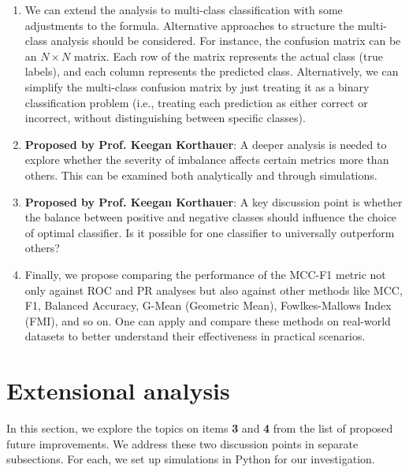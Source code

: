 \documentclass[12pt, oneside]{amsart}
\theoremstyle{definition}
\theoremstyle{remark}
\numberwithin{equation}{section}
\begin{document}
\begin{enumerate}
    \item We can extend the analysis to multi-class classification with some adjustments to the formula. Alternative approaches to structure the multi-class analysis should be considered. For instance, the confusion matrix can be an $N \times N$ matrix. Each row of the matrix represents the actual class (true labels), and each column represents the predicted class. Alternatively, we can simplify the multi-class confusion matrix by just treating it as a binary classification problem (i.e., treating each prediction as either correct or incorrect, without distinguishing between specific classes). 
    \item \textbf{Proposed by Prof. Keegan Korthauer}: A deeper analysis is needed to explore whether the severity of imbalance affects certain metrics more than others. This can be examined both analytically and through simulations.
    \item \textbf{Proposed by Prof. Keegan Korthauer}: A key discussion point is whether the balance between positive and negative classes should influence the choice of optimal classifier. Is it possible for one classifier to universally outperform others?
    \item Finally, we propose comparing the performance of the MCC-F1 metric not only against ROC and PR analyses but also against other methods like MCC, F1, Balanced Accuracy, G-Mean (Geometric Mean), Fowlkes-Mallows Index (FMI), and so on. One can apply and compare these methods on real-world datasets to better understand their effectiveness in practical scenarios.
\end{enumerate}
\section{Extensional analysis}
In this section, we explore the topics on items \textbf{3} and \textbf{4} from the list of proposed future improvements. We address these two discussion points in separate subsections. For each, we set up simulations in Python for our investigation.
\end{document}

